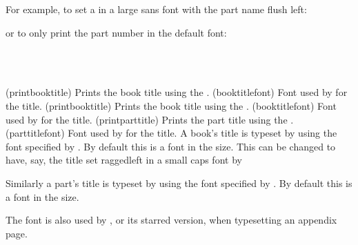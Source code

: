     For example, to set a \cmd{\part} in a large sans font with the part 
name flush left:
\begin{lcode}
\renewcommand{\partnamefont}{\normalfont\huge\sffamily\raggedright}
\renewcommand{\partnumfont}{\normalfont\huge\sffamily}
\end{lcode}
or to only print the part number in the default font:
\begin{lcode}
\renewcommand{\printpartname}{}
\renewcommand{\partnamenum}{}
\end{lcode}


\begin{syntax}
\cmd{\printbooktitle} \cmd{\booktitlefont} \\
\cmd{\printparttitle} \cmd{\parttitlefont} \\
\end{syntax}
\glossary(printbooktitle)%
  {}%
  {Prints the book title using the .}
\glossary(booktitlefont)%
  {}%
  {Font used by  for the title.}
\glossary(printbooktitle)%
  {}%
  {Prints the book title using the .}
\glossary(booktitlefont)%
  {}%
  {Font used by  for the title.}
\glossary(printparttitle)%
  {}%
  {Prints the part title using the .}
\glossary(parttitlefont)%
  {}%
  {Font used by  for the title.}
A book's title is typeset by \cmd{\printbooktitle} using the font specified 
by \cmd{\booktitlefont}. 
By default this is a \cmd{\bfseries} font in the \cmd{\Huge} size. This can
be changed to have, say, the title set raggedleft in a small caps font by
\begin{lcode}
\renewcommand{\booktitlefont}{\normalfont\Huge\scshape\raggedleft}
\end{lcode}

    Similarly a part's title is typeset by \cmd{\printparttitle} using 
the font specified by \cmd{\parttitlefont}. 
By default this is a \cmd{\bfseries} font in the \cmd{\Huge} size. 

    The \cmd{\parttitlefont} font is also used by 
\cmd{\appendixpage}, or its starred version, when
typesetting an appendix page.

